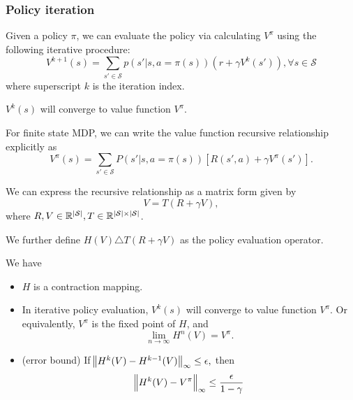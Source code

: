 \begin{refsection}
\subsubsection{Policy iteration}

\begin{definition}
	Given a policy $\pi$, we can evaluate the policy via calculating $V^\pi$ 
	using the following iterative procedure:
	$$V^{k+1}(s) = \sum_{s' \in \mathcal{S}}p(s'|s,a = \pi(s))(r + \gamma V^{k}(s')), \forall s\in \mathcal{S}$$
	where superscript $k$ is the iteration index.
	
$V^{k}(s)$ will converge to value function $V^\pi$. 
\end{definition}

\begin{theorem}
For finite state MDP, we can write the value function recursive relationship explicitly as
	$$V^\pi(s) = \sum_{s'\in \mathcal{S}}P(s'|s, a = \pi(s))[R(s',a)+ \gamma V^\pi(s')].$$

We can express the recursive relationship as a matrix form given by
$$V = T(R + \gamma V),$$
where $R,V \in \mathbb{R}^{|\mathcal{S}|}, T\in \mathbb{R}^{|\mathcal{S}|\times |\mathcal{S}|}$. 

We further define $H(V) \triangle T(R + \gamma V)$ as the policy evaluation operator. 

We have
\begin{itemize}
	\item $H$ is a contraction mapping.
	\item In iterative policy evaluation, $V^{k}(s)$ will converge to value function $V^\pi$. Or equivalently, $V^\pi$ is the fixed point of $H$, and
	$$\lim_{n\to\infty} H^{n}(V) = V^\pi.$$
	\item (error bound) If $\norm{H^k(V) - H^{k-1}(V)}_\infty \leq \epsilon,$ then
	$$\norm{H^k(V) - V^\pi}_\infty \leq \frac{\epsilon}{1 - \gamma}$$
\end{itemize}


\end{theorem}
\end{refsection}
